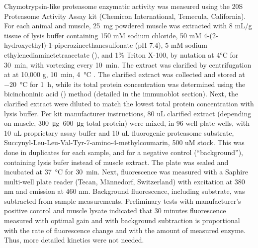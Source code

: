 \documentclass[12pt,english]{report}\usepackage[]{graphicx}\usepackage[]{color}
\begin{document}
Chymotrypsin-like proteasome enzymatic activity was measured using
the 20S Proteasome Activity Assay kit (Chemicon International, Temecula,
California). For each animal and muscle, \SI{25}{\milli\gram} powdered
muscle was extracted with 8 mL/g tissue of lysis buffer containing
150 mM sodium chloride, 50 mM 4-(2-hydroxyethyl)-1-piperazineethanesulfonate
(pH 7.4), 5 mM sodium ethylenediaminetetraacetate (),
and 1\% Triton X-100, by nutation at 4°C for \SI{30}{\minute}, with
vortexing every \SI{10}{\minute}. The extract was clarified by centrifugation
at at 10,000 g, \SI{10}{\minute}, \SI{4}{\celsius} . The clarified
extract was collected and stored at \SI{-20}{\celsius} for \SI{1}{\hour},
while its total protein concentration was determined using the bicinchoninic
acid () method (detailed in
the immunoblot section). Next, the clarified extract were diluted
to match the lowest total protein concentration with lysis buffer.
Per kit manufacturer instructions, 80 uL clarified extract (depending
on muscle, \SIrange{300}{600}{\micro\gram} total protein) were mixed,
in 96-well plate wells, with 10 uL proprietary assay buffer and 10
uL fluorogenic proteasome substrate, Succynyl-Leu-Leu-Val-Tyr-7-amino-4-methylcoumarin,
500 uM stock. This was done in duplicates for each sample, and for
a negative control (``background''), containing lysis bufer instead
of muscle extract. The plate was sealed and incubated at \SI{37}{\celsius}
for \SI{30}{\minute}. Next, fluorescence was measured with a Saphire
multi-well plate reader (Tecan, Männedorf, Switzerland) with excitation
at 380 nm and emission at 460 nm. Background fluorescence, including
substrate, was subtracted from sample measurements. Preliminary tests
with manufacturer's positive control and muscle lysate indicated that
30 minutes fluorescence measured with optimal gain and with background
subtraction is proportional with the rate of fluorescence change and
with the amount of measured enzyme. Thus, more detailed kinetics were
not needed.
\end{document}

